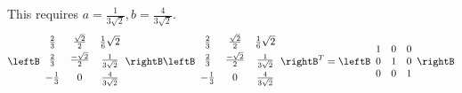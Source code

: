 \begin{enumialphparenastyle}
\begin{ex}
\begin{sol}
This requires $a=\frac{1}{3\sqrt{2}},b=\frac{4}{3\sqrt{2}}$.
\[
\leftB
\begin{array}{ccc}
\vspace{0.05in}\frac{2}{3} & \frac{\sqrt{2}}{2} & \frac{1}{6}\sqrt{2} \\
\vspace{0.05in}\frac{2}{3} & \frac{-\sqrt{2}}{2} & \frac{1}{3\sqrt{2}} \\
-\vspace{0.05in}\frac{1}{3} & 0 & \frac{4}{3\sqrt{2}}
\end{array}
\rightB \leftB
\begin{array}{ccc}
\vspace{0.05in}\frac{2}{3} & \frac{\sqrt{2}}{2} & \frac{1}{6}\sqrt{2} \\
\vspace{0.05in}\frac{2}{3} & \frac{-\sqrt{2}}{2} & \frac{1}{3\sqrt{2}} \\
-\vspace{0.05in}\frac{1}{3} & 0 & \frac{4}{3\sqrt{2}}
\end{array}
\rightB ^{T}=\allowbreak \leftB
\begin{array}{ccc}
1 & 0 & 0 \\
0 & 1 & 0 \\
0 & 0 & 1
\end{array}
\rightB \]
\end{sol}
\end{ex}



\end{enumialphparenastyle}
